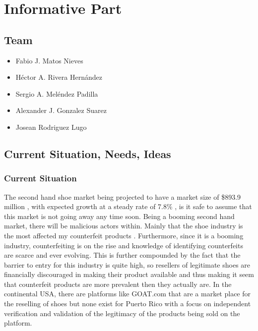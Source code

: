 \chapter{Informative Part}
\section{Team}
\begin{itemize}
  \item Fabio J. Matos Nieves
  \item Héctor A. Rivera Hernández
  \item Sergio A. Meléndez Padilla
  \item Alexander J. Gonzalez Suarez
  \item Josean Rodriguez Lugo
\end{itemize}
\section{Current Situation, Needs, Ideas}
\subsection{Current Situation}
\hspace{1cm} The second hand shoe market being projected to have a market size of \$893.9 million \cite{SecondHandDesigner}, with expected growth at a steady rate of 7.8\% \cite{SecondHandDesigner2022}, is it safe to assume that this market is not going away any time soon. Being a booming second hand market, there will be malicious actors within. Mainly that the shoe industry is the most affected my counterfeit products \cite{InfographicIndustriesMost2019}. Furthermore, since it is a booming industry, counterfeiting is on the rise and knowledge of identifying counterfeits are scarce and ever evolving. This is further compounded by the fact that the barrier to entry for this industry is quite high, so resellers of legitimate shoes are financially discouraged in making their product available and thus making it seem that counterfeit products are more prevalent then they actually are. In the continental USA, there are platforms like GOAT.com that are a market place for the reselling of shoes but none exist for Puerto Rico with a focus on independent verification and validation of the legitimacy of the products being sold on the platform.
